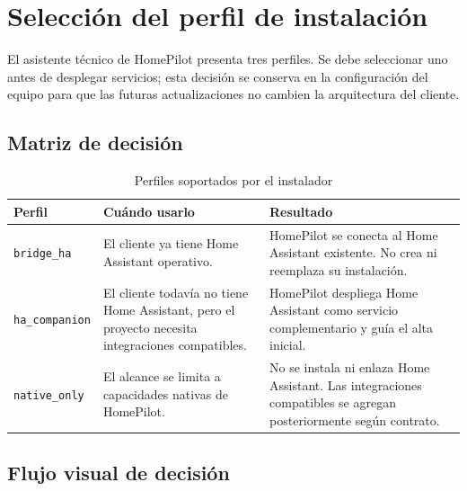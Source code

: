 \section{Selección del perfil de instalación}

El asistente técnico de HomePilot presenta tres perfiles. Se debe seleccionar uno antes de desplegar servicios; esta decisión se conserva en la configuración del equipo para que las futuras actualizaciones no cambien la arquitectura del cliente.

\subsection{Matriz de decisión}
\begin{table}[h]
\centering
\begin{tabularx}{\textwidth}{|L{0.22\textwidth}|L{0.24\textwidth}|X|}
\hline
\textbf{Perfil} & \textbf{Cuándo usarlo} & \textbf{Resultado} \\
\hline
\texttt{bridge\_ha} & El cliente ya tiene Home Assistant operativo. & HomePilot se conecta al Home Assistant existente. No crea ni reemplaza su instalación. \\
\hline
\texttt{ha\_companion} & El cliente todavía no tiene Home Assistant, pero el proyecto necesita integraciones compatibles. & HomePilot despliega Home Assistant como servicio complementario y guía el alta inicial. \\
\hline
\texttt{native\_only} & El alcance se limita a capacidades nativas de HomePilot. & No se instala ni enlaza Home Assistant. Las integraciones compatibles se agregan posteriormente según contrato. \\
\hline
\end{tabularx}
\caption{Perfiles soportados por el instalador}
\end{table}

\subsection{Flujo visual de decisión}
\begin{center}
\end{center}

